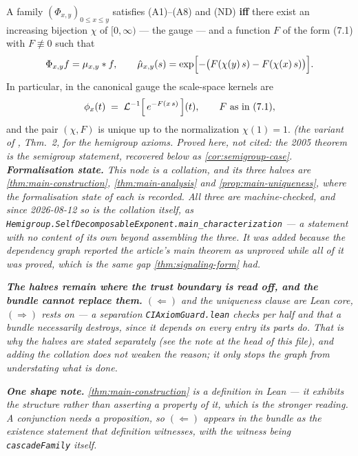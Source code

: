 \begin{theorem}\label{thm:main-characterization}
\leanok
A family $(\Phi_{x,y})_{0 \le x \le y}$ satisfies (A1)--(A8) and (ND) \textbf{iff} there exist
an increasing bijection $\chi$ of $[0,\infty)$ --- the gauge --- and a function $F$ of the
form (7.1) with $F \not\equiv 0$ such that
\[
  \Phi_{x,y} f = \mu_{x,y} * f, \qquad
  \hat\mu_{x,y}(s) = \exp\Bigl[-\bigl(F(\chi(y)\,s) - F(\chi(x)\,s)\bigr)\Bigr].
\]
In particular, in the canonical gauge the scale-space kernels are
\[
  \phi_{x}(t) \;=\; \mathcal{L}^{-1}\Bigl[\, e^{-F(x\,s)} \,\Bigr](t),
  \qquad F \text{ as in } (7.1),
\]
and the pair $(\chi, F)$ is unique up to the normalization $\chi(1) = 1$.
\statusT\quad\emph{(the variant of , Thm.~2, for the hemigroup
axioms. Proved here, not cited: the 2005 theorem is the semigroup statement, recovered below
as \ref{cor:semigroup-case}. \textbf{Formalisation state.} This node is a collation, and its
three halves are \ref{thm:main-construction}, \ref{thm:main-analysis} and
\ref{prop:main-uniqueness}, where the formalisation state of each is recorded. All three
are machine-checked, and since 2026-08-12 so is the collation itself, as
\texttt{Hemigroup.SelfDecomposableExponent.main\_characterization} --- a statement with no
content of its own beyond assembling the three. It was added because the dependency graph
reported the article's main theorem as unproved while all of it was proved, which is the same
gap \ref{thm:signaling-form} had.}

\emph{\textbf{The halves remain where the trust boundary is read off, and the bundle cannot
replace them.} $(\Leftarrow)$ and the uniqueness clause are Lean core, $(\Rightarrow)$ rests on
 --- a separation \texttt{CIAxiomGuard.lean} checks
per half and that a bundle necessarily destroys, since it depends on every entry its parts do. That is why the halves
are stated separately (see the note at the head of this file), and adding the collation does not
weaken the reason; it only stops the graph from understating what is done.}

\emph{\textbf{One shape note.} \ref{thm:main-construction} is a \emph{definition} in Lean --- it
exhibits the structure rather than asserting a property of it, which is the stronger reading. A
conjunction needs a proposition, so $(\Leftarrow)$ appears in the bundle as the existence
statement that definition witnesses, with the witness being \texttt{cascadeFamily} itself.}


\end{theorem}
